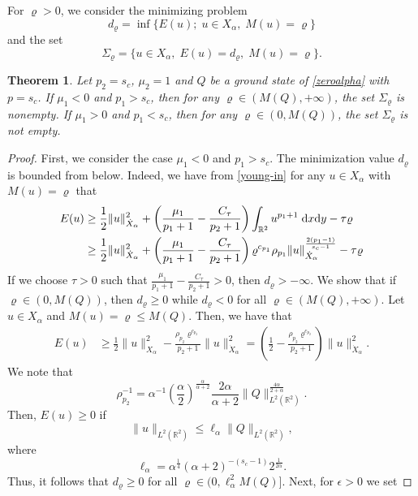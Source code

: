 \documentclass[10pt]{article}
\numberwithin{equation}{section}
\newtheorem{theorem}{\quad Theorem}[section]
\newcommand{\lt}{{L^2(\mathbb{R}^2)}}
\newcommand{\dz}{\;{\rm d}x{\rm d}y}
\newcommand{\xx}{{\dot{X}_\alpha}}
\newcommand{\mo}{\mu_1}  \newcommand{\po}{{p_1}}
\newcommand{\moo}{\mu_2}  \newcommand{\poo}{{p_2}}
\newcommand{\al}{\alpha}
\newcommand{\rt}{{\mathbb{R}^2}}
\begin{document}
	For $\varrho>0$, we consider the minimizing problem
	\begin{equation}\label{minim-normal}
		d_\varrho=\inf\{E(u);\; u\in X_\al,\;M(u)=\varrho\}
	\end{equation}
	and the set
	\[
	\Sigma_\varrho=\{u\in X_\al,\; E(u)=d_\varrho,\;M(u)=\varrho\}.
	\]
	\begin{theorem}\label{criticalcase-normalized}
		Let $p_2=s_c$, $\moo=1$ and $Q$ be a ground state of \eqref{zeroalpha} with $p=s_c$.
		If $\mo<0$ and $\po>s_c$, then for any $\varrho\in(M(Q),+\infty)$, the set $\Sigma_\varrho$ is nonempty.
		If $\mo>0$ and $\po<s_c$, then for any $\varrho\in(0,M(Q))$, the set $\Sigma_\varrho$ is not empty.
	\end{theorem}
	\begin{proof}
		First, we consider the case $\mo<0$ and $p_1>s_c$. The minimization value $d_\varrho$ is bounded from below. Indeed, we have from \eqref{young-in} for any $u\in X_\al$ with $M(u)=\varrho$ that
		\begin{equation}\label{bound-below}
			\begin{split}
				E(u)&\geq\frac{1}{2}\|u\|_{\xx}^2
				+\left(\frac{\mo}{\po+1}-\frac{C_\tau}{\poo+1}\right)\int_\rt u^{\po+1}\dz-\tau\varrho\\
				& \geq\frac{1}{2}\|u\|_{\xx}^2
				+\left(\frac{\mo}{\po+1}-\frac{C_\tau}{\poo+1}\right)\varrho^{c_{p_1}}\rho_{p_1}\|u\|_{\xx}^{\frac{2(p_1-1)}{s_c-1}}-\tau\varrho
		\end{split}	\end{equation}
		If we choose $\tau>0$ such that $\frac{\mo}{\po+1}-\frac{C_\tau}{\poo+1}>0$, then $d_\varrho>-\infty$. We show that if $\varrho\in(0,M(Q))$, then $d_\varrho\geq0$ while $d_\varrho<0$ for all $\varrho\in(M(Q),+\infty)$. Let $u\in X_\al$ and $M(u)=\varrho\leq M(Q)$. Then, we have that
		\[
		\begin{split}
			E(u)
			&\geq\frac12\|u\|_{X_\al}^2-\frac{  \rho_{p_2}\varrho^{c_{p_2}}}{p_2+1}\|u\|_{\xx}^2
			=\left(\frac12-\frac{  \rho_{p_2}\varrho^{c_{p_2}}}{p_2+1}\right)\|u\|_{\xx}^2.
		\end{split}	\]
		We note that
		\[
		\rho_{p_2}^{-1}=\al^{-1}\left(\frac\al2\right)^{\frac{\al}{\al+2}}\frac{2\al}{\al+2}\|Q\|_\lt^{\frac{4\al}{2+\al}}.
		\]
		Then, $E(u)\geq0$ if
		\[
		\|u\|_\lt\leq\ell_\al \|Q\|_\lt,
		\]
		where
		\[
		\ell_\al = \al^{\frac14}(\al+2)^{-(s_c-1)}2^{\frac1{2\al}}.%
		\]
		Thus, it follows that $d_\varrho\geq0$ for all $\varrho\in(0,\ell_\al^2 M(Q)]$. Next, for $\epsilon>0$ we set  

\end{proof}
\end{document}
